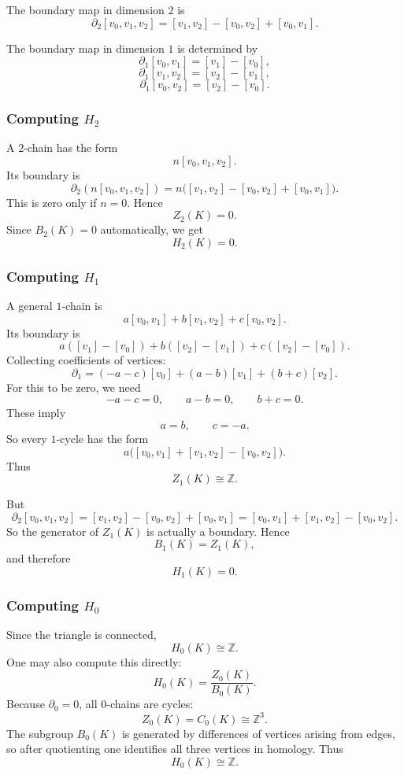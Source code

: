 \documentclass[12pt,a4paper]{article}
\theoremstyle{notespace}
\begin{document}
The boundary map in dimension \(2\) is
\[
\partial_2[v_0,v_1,v_2]
=
[v_1,v_2]-[v_0,v_2]+[v_0,v_1].
\]

The boundary map in dimension \(1\) is determined by
\[
\partial_1[v_0,v_1]=[v_1]-[v_0],
\]
\[
\partial_1[v_1,v_2]=[v_2]-[v_1],
\]
\[
\partial_1[v_0,v_2]=[v_2]-[v_0].
\]

\subsubsection{Computing \texorpdfstring{$H_2$}{H2}}

A \(2\)-chain has the form
\[
n[v_0,v_1,v_2].
\]
Its boundary is
\[
\partial_2(n[v_0,v_1,v_2])
=
n\bigl([v_1,v_2]-[v_0,v_2]+[v_0,v_1]\bigr).
\]
This is zero only if \(n=0\). Hence
\[
Z_2(K)=0.
\]
Since \(B_2(K)=0\) automatically, we get
\[
H_2(K)=0.
\]

\subsubsection{Computing \texorpdfstring{$H_1$}{H1}}

A general \(1\)-chain is
\[
a[v_0,v_1]+b[v_1,v_2]+c[v_0,v_2].
\]
Its boundary is
\[
a([v_1]-[v_0]) + b([v_2]-[v_1]) + c([v_2]-[v_0]).
\]
Collecting coefficients of vertices:
\[
\partial_1
=
(-a-c)[v_0] + (a-b)[v_1] + (b+c)[v_2].
\]
For this to be zero, we need
\[
-a-c=0,\qquad a-b=0,\qquad b+c=0.
\]
These imply
\[
a=b,\qquad c=-a.
\]
So every \(1\)-cycle has the form
\[
a\bigl([v_0,v_1]+[v_1,v_2]-[v_0,v_2]\bigr).
\]
Thus
\[
Z_1(K)\cong \mathbb{Z}.
\]

But
\[
\partial_2[v_0,v_1,v_2]
=
[v_1,v_2]-[v_0,v_2]+[v_0,v_1]
=
[v_0,v_1]+[v_1,v_2]-[v_0,v_2].
\]
So the generator of \(Z_1(K)\) is actually a boundary. Hence
\[
B_1(K)=Z_1(K),
\]
and therefore
\[
H_1(K)=0.
\]

\subsubsection{Computing \texorpdfstring{$H_0$}{H0}}

Since the triangle is connected,
\[
H_0(K)\cong \mathbb{Z}.
\]
One may also compute this directly:
\[
H_0(K)=\frac{Z_0(K)}{B_0(K)}.
\]
Because \(\partial_0=0\), all \(0\)-chains are cycles:
\[
Z_0(K)=C_0(K)\cong \mathbb{Z}^3.
\]
The subgroup \(B_0(K)\) is generated by differences of vertices arising from edges, so after quotienting one identifies all three vertices in homology. Thus
\[
H_0(K)\cong \mathbb{Z}.
\]
\end{document}
